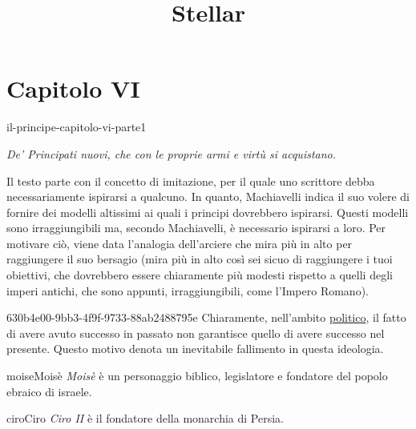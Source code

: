 \documentclass[preview]{standalone}
\begin{document}
\title{Stellar}
\genpage

\section{Capitolo VI}

\begin{snippet}{il-principe-capitolo-vi-parte1}
    \begin{center}
        \begin{minipage}{0.75\textwidth}
            \itshape
            De' Principati nuovi, che con le proprie armi e virtù si acquistano. 
        \end{minipage}
    \end{center}
    \vspace{0.25cm}
    Il testo parte con il concetto di imitazione, per il quale uno scrittore
    debba necessariamente ispirarsi a qualcuno.
    In quanto, Machiavelli indica il suo volere di fornire dei modelli altissimi
    ai quali i principi dovrebbero ispirarsi.
    Questi modelli sono irraggiungibili ma, secondo Machiavelli, è necessario ispirarsi a loro.
    Per motivare ciò, viene data l'analogia dell'arciere che mira più in alto per raggiungere il suo bersagio
    (mira più in alto così sei sicuo di raggiungere i tuoi obiettivi, che dovrebbero essere chiaramente
    più modesti rispetto a quelli degli imperi antichi, che sono appunti, irraggiungibili, come l'Impero Romano).
\end{snippet}

\begin{snippetnote}{630b4e00-9bb3-4f9f-9733-88ab2488795e}{}
    Chiaramente, nell'ambito \underline{politico}, il fatto di avere avuto successo in passato
    non garantisce quello di avere successo nel presente.
    Questo motivo denota un inevitabile fallimento in questa ideologia.
\end{snippetnote}


\begin{snippetcharacter}{moise}{Moisè}
    \textit{Moisè} è un personaggio biblico, legislatore e fondatore del popolo ebraico di israele.
\end{snippetcharacter}

\begin{snippetcharacter}{ciro}{Ciro}
    \textit{Ciro II} è il fondatore della monarchia di Persia.
\end{snippetcharacter}
\end{document}
